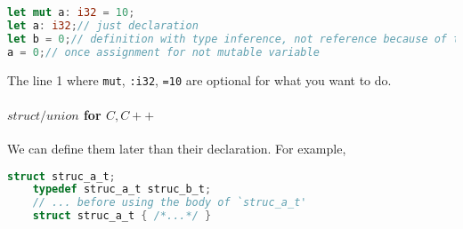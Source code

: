 \lstset{style=GlobalRust}
\begin{lstlisting}[language=Rust]
let mut a: i32 = 10;
let a: i32;// just declaration
let b = 0;// definition with type inference, not reference because of this for basic type
a = 0;// once assignment for not mutable variable
\end{lstlisting}
The line 1 where \verb`mut`, \verb`:i32`, \verb`=10` 
are optional for what you want to do.


\paragraph{$struct/union$ for $C,C++$}

We can define them later than their declaration. For example,
\lstset{style=GlobalC}
\begin{lstlisting}[language=C]
	struct struc_a_t;
	typedef struc_a_t struc_b_t;
	// ... before using the body of `struc_a_t'
	struct struc_a_t { /*...*/ }
\end{lstlisting}


